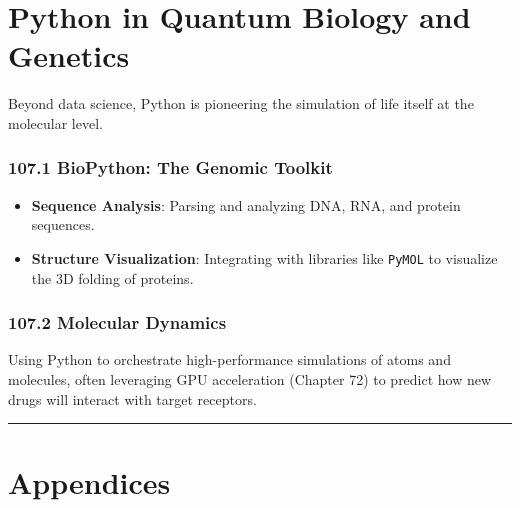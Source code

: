 \hypertarget{python-in-quantum-biology-and-genetics}{%
\chapter{Python in Quantum Biology and
Genetics}\label{python-in-quantum-biology-and-genetics}}

Beyond data science, Python is pioneering the simulation of life itself
at the molecular level.

\hypertarget{biopython-the-genomic-toolkit}{%
\subsection{107.1 BioPython: The Genomic
Toolkit}\label{biopython-the-genomic-toolkit}}

\begin{itemize}
\tightlist
\item
  \textbf{Sequence Analysis}: Parsing and analyzing DNA, RNA, and
  protein sequences.
\item
  \textbf{Structure Visualization}: Integrating with libraries like
  \passthrough{\lstinline!PyMOL!} to visualize the 3D folding of
  proteins.
\end{itemize}

\hypertarget{molecular-dynamics}{%
\subsection{107.2 Molecular Dynamics}\label{molecular-dynamics}}

Using Python to orchestrate high-performance simulations of atoms and
molecules, often leveraging GPU acceleration (Chapter 72) to predict how
new drugs will interact with target receptors.

\begin{center}\rule{0.5\linewidth}{0.5pt}\end{center}

\hypertarget{appendices}{%
\chapter{Appendices}\label{appendices}}
